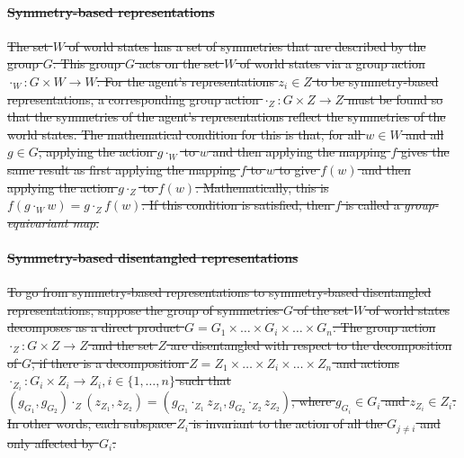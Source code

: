 \paragraph{\sout{Symmetry-based representations}}
\sout{
	The set $W$ of world states has a set of symmetries that are described by the group $G$.
	This group $G$ acts on the set $W$ of world states via a group action $\cdot_{W}: G \times W \to W$.
	For the agent's representations $z_i \in Z$ to be symmetry-based representations, a corresponding group action $\cdot_{Z}: G \times Z \to Z$ must be found so that the symmetries of the agent's representations reflect the symmetries of the world states.
	The mathematical condition for this is that, for all $w \in W$ and all $g \in G$, applying the action $g \cdot_W$ to $w$ and then applying the mapping $f$ gives the same result as first applying the mapping $f$ to $w$ to give $f(w)$ and then applying the action $g \cdot_Z$ to $f(w)$.
	Mathematically, this is $f(g \cdot_W w) = g \cdot_Z f(w)$.
	If this condition is satisfied, then $f$ is called a \textit{group-equivariant map}.
}

\paragraph{\sout{Symmetry-based disentangled representations}}
\sout{
	To go from symmetry-based representations to symmetry-based disentangled representations, suppose the group of symmetries $G$ of the set $W$ of world states decomposes as a direct product $G = G_1 \times \hdots \times G_i \times \hdots \times G_n$.
	The group action $\cdot_Z : G \times Z \to Z$ and the set $Z$ are disentangled with respect to the decomposition of $G$, if there is a decomposition $Z = Z_1 \times \hdots \times Z_i \times \hdots \times Z_n$ and actions $\cdot_{Z_i}: G_i \times Z_i \to Z_i, i \in \{1, \hdots, n\}$ such that $(g_{G_1}, g_{G_2}) \cdot_Z (z_{Z_1}, z_{Z_2}) = (g_{G_1} \cdot_{Z_1} z_{Z_1}, g_{G_2} \cdot_{Z_2} z_{Z_2})$, where $g_{G_i} \in G_i$ and $z_{Z_i} \in Z_i$.
	In other words, each subspace $Z_i$ is invariant to the action of all the $G_{j \neq i}$ and only affected by $G_i$.
}

